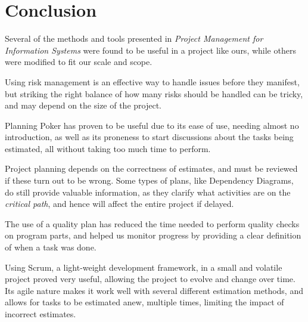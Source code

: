 \section{Conclusion}

Several of the methods and tools presented in \emph{Project Management for
Information Systems}\cite{caye} were found to be useful in a project like ours,
while others were modified to fit our scale and scope.

Using risk management is an effective way to handle issues before they
manifest, but striking the right balance of how many risks should be handled
can be tricky, and may depend on the size of the project.

Planning Poker has proven to be useful due to its ease of use, needing
almost no introduction, as well as its proneness to start discussions about the
tasks being estimated, all without taking too much time to perform.

Project planning depends on the correctness of estimates, and must be reviewed
if these turn out to be wrong. Some types of plans, like Dependency Diagrams, do
still provide valuable information, as they clarify what activities are on the
\emph{critical path}, and hence will affect the entire project if delayed.

The use of a quality plan has reduced the time needed to perform quality checks
on program parts, and helped us monitor progress by providing a clear
definition of when a task was done.

Using Scrum, a light-weight development framework, in a small and volatile
project proved very useful, allowing the project to evolve and change over
time. Its agile nature makes it work well with several different estimation
methods, and allows for tasks to be estimated anew, multiple times, limiting
the impact of incorrect estimates.
